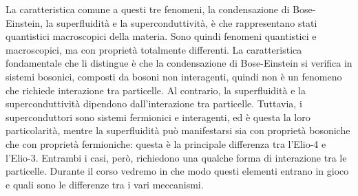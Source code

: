 La caratteristica comune a questi tre fenomeni, la condensazione di Bose-Einstein, la superfluidità e la superconduttività, è che rappresentano stati quantistici macroscopici della materia. Sono quindi fenomeni quantistici e macroscopici, ma con proprietà totalmente differenti. La caratteristica fondamentale che li distingue è che la condensazione di Bose-Einstein si verifica in sistemi bosonici, composti da bosoni non interagenti, quindi non è un fenomeno che richiede interazione tra particelle. Al contrario, la superfluidità e la superconduttività dipendono dall'interazione tra particelle. Tuttavia, i superconduttori sono sistemi fermionici e interagenti, ed è questa la loro particolarità, mentre la superfluidità può manifestarsi sia con proprietà bosoniche che con proprietà fermioniche: questa è la principale differenza tra l'Elio-4 e l'Elio-3. Entrambi i casi, però, richiedono una qualche forma di interazione tra le particelle. Durante il corso vedremo in che modo questi elementi entrano in gioco e quali sono le differenze tra i vari meccanismi.
